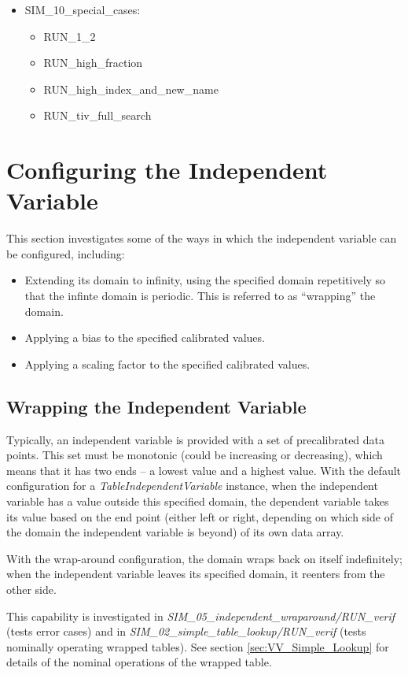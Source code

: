 \documentclass[11pt,fleqn]{report}
\begin{document}
\begin{itemize}
  \item SIM\_10\_special\_cases:
  \begin{itemize}
    \item RUN\_1\_2
    \item RUN\_high\_fraction
    \item RUN\_high\_index\_and\_new\_name
    \item RUN\_tiv\_full\_search
  \end{itemize}
\end{itemize}

\section {Configuring the Independent Variable}

This section investigates some of the ways in which the independent variable
can be configured, including:
\begin{itemize}
\item Extending its domain to infinity, using the specified domain
repetitively so that the infinte domain is periodic.
This is referred to as ``wrapping'' the domain.
\item Applying a bias to the specified calibrated values.
\item Applying a scaling factor to the specified calibrated values.
\end{itemize}

\subsection {Wrapping the Independent Variable}

Typically, an independent variable is provided with a set of
precalibrated data points.  This set must be monotonic (could be increasing
or decreasing), which means that it has two ends -- a lowest value and a
highest value.  With the default configuration for a
\textit{TableIndependentVariable} instance, when the independent variable
has a value outside this specified domain, the dependent variable takes its
value based on the end point (either left or right, depending on which side
of the domain the independent variable is beyond) of its own data array.

With the wrap-around configuration, the domain wraps back on itself
indefinitely; when the independent variable leaves its
specified domain, it reenters from the other side.

This capability is investigated in
\textit{SIM\_05\_independent\_wraparound/RUN\_verif} (tests error cases)
and in \textit{SIM\_02\_simple\_table\_lookup/RUN\_verif} (tests nominally
operating wrapped tables).  See section \ref{sec:VV_Simple_Lookup}
for details of the nominal operations of the wrapped table.
\end{document}
